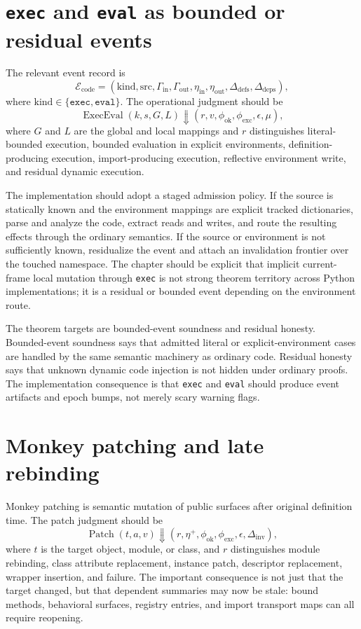 \documentclass[11pt]{report}
\begin{document}
\section{\texttt{exec} and \texttt{eval} as bounded or residual events}
The relevant event record is
\[
\mathcal{E}_{\mathrm{code}} = (\mathrm{kind},\mathrm{src},\Gamma_{\mathrm{in}},\Gamma_{\mathrm{out}},\eta_{\mathrm{in}},\eta_{\mathrm{out}},\Delta_{\mathrm{defs}},\Delta_{\mathrm{deps}}),
\]
where $\mathrm{kind}\in\{\texttt{exec},\texttt{eval}\}$. The operational judgment should be
\[
\operatorname{ExecEval}(k,s,G,L) \Downarrow (r,v,\phi_{\mathrm{ok}},\phi_{\mathrm{exc}},\epsilon,\mu),
\]
where $G$ and $L$ are the global and local mappings and $r$ distinguishes literal-bounded execution, bounded evaluation in explicit environments, definition-producing execution, import-producing execution, reflective environment write, and residual dynamic execution.

The implementation should adopt a staged admission policy. If the source is statically known and the environment mappings are explicit tracked dictionaries, parse and analyze the code, extract reads and writes, and route the resulting effects through the ordinary semantics. If the source or environment is not sufficiently known, residualize the event and attach an invalidation frontier over the touched namespace. The chapter should be explicit that implicit current-frame local mutation through \texttt{exec} is not strong theorem territory across Python implementations; it is a residual or bounded event depending on the environment route.

The theorem targets are bounded-event soundness and residual honesty. Bounded-event soundness says that admitted literal or explicit-environment cases are handled by the same semantic machinery as ordinary code. Residual honesty says that unknown dynamic code injection is not hidden under ordinary proofs. The implementation consequence is that \texttt{exec} and \texttt{eval} should produce event artifacts and epoch bumps, not merely scary warning flags.
\section{Monkey patching and late rebinding}
Monkey patching is semantic mutation of public surfaces after original definition time. The patch judgment should be
\[
\operatorname{Patch}(t,a,v) \Downarrow (r,\eta^{+},\phi_{\mathrm{ok}},\phi_{\mathrm{exc}},\epsilon,\Delta_{\mathrm{inv}}),
\]
where $t$ is the target object, module, or class, and $r$ distinguishes module rebinding, class attribute replacement, instance patch, descriptor replacement, wrapper insertion, and failure. The important consequence is not just that the target changed, but that dependent summaries may now be stale: bound methods, behavioral surfaces, registry entries, and import transport maps can all require reopening.
\end{document}
